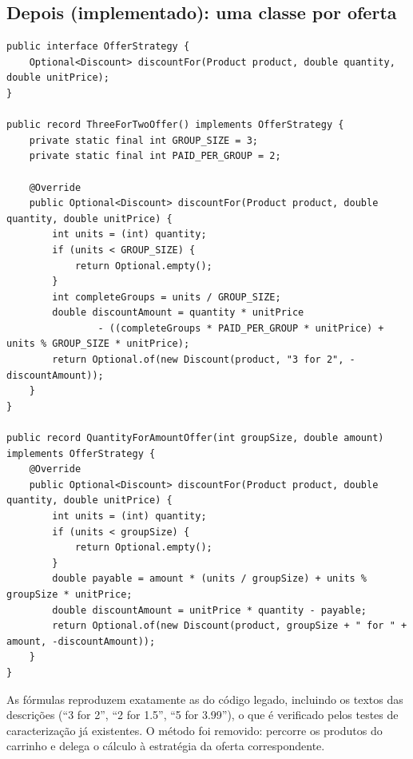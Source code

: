 \subsection{Depois (implementado): uma classe por oferta}
\begin{lstlisting}
public interface OfferStrategy {
    Optional<Discount> discountFor(Product product, double quantity, double unitPrice);
}

public record ThreeForTwoOffer() implements OfferStrategy {
    private static final int GROUP_SIZE = 3;
    private static final int PAID_PER_GROUP = 2;

    @Override
    public Optional<Discount> discountFor(Product product, double quantity, double unitPrice) {
        int units = (int) quantity;
        if (units < GROUP_SIZE) {
            return Optional.empty();
        }
        int completeGroups = units / GROUP_SIZE;
        double discountAmount = quantity * unitPrice
                - ((completeGroups * PAID_PER_GROUP * unitPrice) + units % GROUP_SIZE * unitPrice);
        return Optional.of(new Discount(product, "3 for 2", -discountAmount));
    }
}

public record QuantityForAmountOffer(int groupSize, double amount) implements OfferStrategy {
    @Override
    public Optional<Discount> discountFor(Product product, double quantity, double unitPrice) {
        int units = (int) quantity;
        if (units < groupSize) {
            return Optional.empty();
        }
        double payable = amount * (units / groupSize) + units % groupSize * unitPrice;
        double discountAmount = unitPrice * quantity - payable;
        return Optional.of(new Discount(product, groupSize + " for " + amount, -discountAmount));
    }
}
\end{lstlisting}
As f\'ormulas reproduzem exatamente as do c\'odigo legado, incluindo os textos das descri\c{c}\~oes (``3 for 2'', ``2 for 1.5'', ``5 for 3.99''), o que \'e verificado pelos testes de caracteriza\c{c}\~ao j\'a existentes. O m\'etodo  foi removido:  percorre os produtos do carrinho e delega o c\'alculo \`a estrat\'egia da oferta correspondente.

